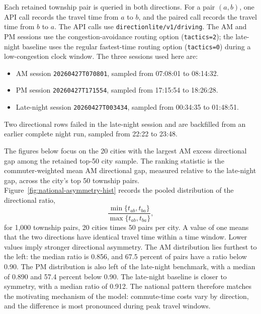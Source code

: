 \documentclass[12pt]{article}
\begin{document}
	Each retained township pair is queried in both directions. For a pair $(a,b)$, one API call records the travel time from $a$ to $b$, and the paired call records the travel time from $b$ to $a$. The API calls use \texttt{directionlite/v1/driving}. The AM and PM sessions use the congestion-avoidance routing option (\texttt{tactics=2}); the late-night baseline uses the regular fastest-time routing option (\texttt{tactics=0}) during a low-congestion clock window. The three sessions used here are:
	\begin{itemize}
		\item AM session \texttt{20260427T070801}, sampled from 07:08:01 to 08:14:32.
		\item PM session \texttt{20260427T171554}, sampled from 17:15:54 to 18:26:28.
		\item Late-night session \texttt{20260427T003434}, sampled from 00:34:35 to 01:48:51.
	\end{itemize}
	
	Two directional rows failed in the late-night session and are backfilled from an earlier complete night run, sampled from 22:22 to 23:48.

	The figures below focus on the 20 cities with the largest AM excess directional gap among the retained top-50 city sample. The ranking statistic is the commuter-weighted mean AM directional gap, measured relative to the late-night gap, across the city's top 50 township pairs.  \\ 
	

	Figure~\ref{fig:national-asymmetry-hist} records the pooled distribution of the directional ratio,
	\[
		\frac{\min\{t_{ab},t_{ba}\}}{\max\{t_{ab},t_{ba}\}},
	\]
	for 1,000 township pairs, 20 cities times 50 pairs per city. A value of one means that the two directions have identical travel time within a time window. Lower values imply stronger directional asymmetry. The AM distribution lies furthest to the left: the median ratio is 0.856, and 67.5 percent of pairs have a ratio below 0.90. The PM distribution is also left of the late-night benchmark, with a median of 0.890 and 57.4 percent below 0.90. The late-night baseline is closer to symmetry, with a median ratio of 0.912. The national pattern therefore matches the motivating mechanism of the model: commute-time costs vary by direction, and the difference is most pronounced during peak travel windows.
\end{document}
